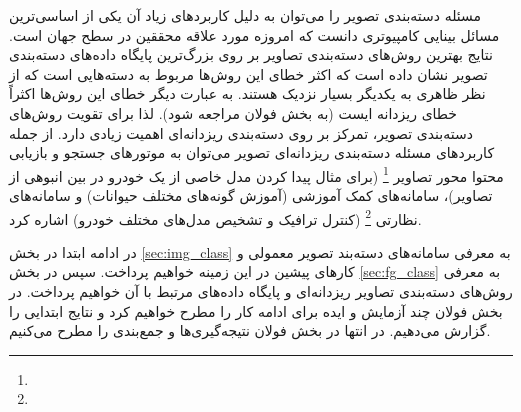 \documentclass[11pt]{article}
\begin{document}
مسئله دسته‌بندی تصویر را می‌توان به دلیل کاربردهای زیاد آن یکی از اساسی‌ترین مسائل بینایی کامپیوتری دانست که امروزه مورد علاقه محققین در سطح جهان است. نتایج بهترین روش‌های دسته‌بندی تصاویر بر روی بزرگ‌ترین پایگاه داده‌های دسته‌بندی تصویر نشان داده است که اکثر خطای این روش‌ها مربوط به دسته‌هایی است که از نظر ظاهری به یکدیگر بسیار نزدیک هستند. به عبارت دیگر خطای این روش‌ها اکثراً خطای ریزدانه ایست (به بخش فولان مراجعه شود). لذا برای تقویت روش‌های دسته‌بندی تصویر، تمرکز بر روی دسته‌بندی ریزدانه‌ای اهمیت زیادی دارد.
از جمله کاربردهای مسئله دسته‌بندی ریزدانه‌ای تصویر می‌توان به موتورهای جستجو و بازیابی محتوا محور تصاویر
\footnote{}
(برای مثال پیدا کردن مدل خاصی از یک خودرو در بین انبوهی از تصاویر)، سامانه‌های کمک آموزشی (آموزش گونه‌های مختلف حیوانات) و سامانه‌های نظارتی
\footnote{}
(کنترل ترافیک و تشخیص مدل‌های مختلف خودرو) اشاره کرد.

در ادامه ابتدا در بخش
\ref{sec:img_class}
به معرفی سامانه‌های دسته‌بند تصویر معمولی و کارهای پیشین در این زمینه خواهیم پرداخت. سپس در بخش
\ref{sec:fg_class}
به معرفی روش‌های دسته‌بندی تصاویر ریزدانه‌ای و پایگاه داده‌های مرتبط با آن خواهیم پرداخت. در بخش فولان چند آزمایش و ایده برای ادامه کار را مطرح خواهیم کرد و نتایج ابتدایی را گزارش می‌دهیم. در انتها در بخش فولان نتیجه‌گیری‌ها و جمع‌بندی را مطرح می‌کنیم.

\end{document}
